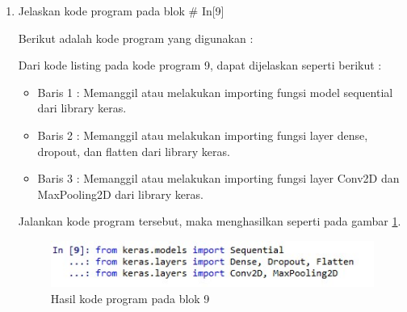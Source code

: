 \begin{enumerate}
\item Jelaskan kode program pada blok \# In[9]
	\par Berikut adalah kode program yang digunakan :
	
	\par Dari kode listing pada kode program 9, dapat dijelaskan seperti berikut :
	\begin{itemize}
	\item Baris 1	: Memanggil atau melakukan importing fungsi model sequential dari library keras.
	\item Baris 2	: Memanggil atau melakukan importing fungsi layer dense, dropout, dan flatten dari library keras.
	\item Baris 3	: Memanggil atau melakukan importing fungsi layer Conv2D dan MaxPooling2D dari library keras.
	\end{itemize}
	\par Jalankan kode program tersebut, maka menghasilkan seperti pada gambar \ref{andri9}.
		\begin{figure}[!hbtp]
		\centering
		\includegraphics[scale=0.5]{figures/chapter7/andri9.jpg}
		\caption{Hasil kode program pada blok 9}
		\label{andri9}
		\end{figure}


\end{enumerate}
